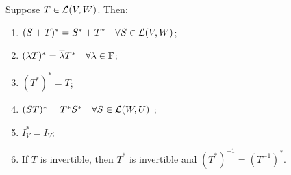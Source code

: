 \begin{thm} 
  \label{thm: properties of the adjoint}
  Suppose $T \in {\mathcal{L}(V,W)}$. Then:
  \begin{enumerate}[label=\textbf{(\alph*)}]
    \item $(S+T)^* = S^*+T^* \quad \forall S \in {\mathcal{L}(V,W)}$;
    \item $(\lambda T)^* = \overline \lambda T^* \quad \forall \lambda \in \mathbb{F}$;
    \item $(T^*)^* = T$;
    \item $(ST)^* = T^* S^* \quad \forall S \in \mathcal{L} (W,U)$ ;
    \item $I^*_V = I_V$;
    \item If $T$ is invertible, then $T^*$ is invertible and $(T^*)^{-1} = (T^{-1})^*$.
  \end{enumerate}
\end{thm}
